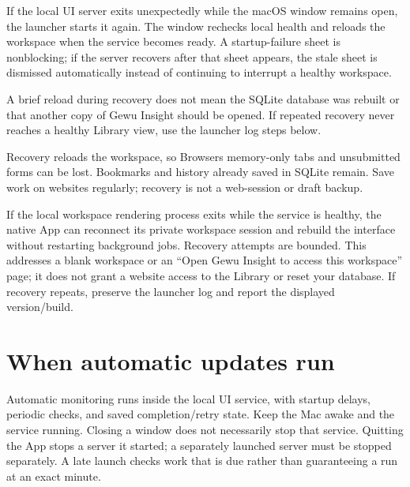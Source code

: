 \documentclass[10pt,letterpaper,oneside]{scrreprt}
\begin{document}
If the local UI server exits unexpectedly while the macOS window remains open, the launcher starts it again. The window rechecks local health and reloads the workspace when the service becomes ready. A startup-failure sheet is nonblocking; if the server recovers after that sheet appears, the stale sheet is dismissed automatically instead of continuing to interrupt a healthy workspace.

A brief reload during recovery does not mean the SQLite database was rebuilt or that another copy of Gewu Insight should be opened. If repeated recovery never reaches a healthy Library view, use the launcher log steps below.

Recovery reloads the workspace, so Browser\textquotesingle s memory-only tabs and unsubmitted forms can be lost. Bookmarks and history already saved in SQLite remain. Save work on websites regularly; recovery is not a web-session or draft backup.

If the local workspace rendering process exits while the service is healthy, the native App can reconnect its private workspace session and rebuild the interface without restarting background jobs. Recovery attempts are bounded. This addresses a blank workspace or an ``Open Gewu Insight to access this workspace'' page; it does not grant a website access to the Library or reset your database. If recovery repeats, preserve the launcher log and report the displayed version/build.

\section{When automatic updates run}\label{when-automatic-updates-run}

Automatic monitoring runs inside the local UI service, with startup delays, periodic checks, and saved completion/retry state. Keep the Mac awake and the service running. Closing a window does not necessarily stop that service. Quitting the App stops a server it started; a separately launched server must be stopped separately. A late launch checks work that is due rather than guaranteeing a run at an exact minute.
\end{document}
